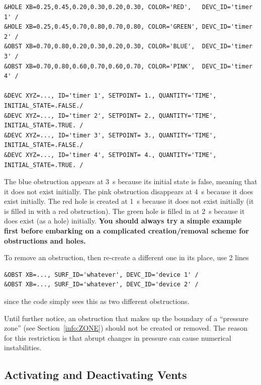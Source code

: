 \documentclass[11pt]{book}
\begin{document}
\footnotesize
\begin{verbatim}
&HOLE XB=0.25,0.45,0.20,0.30,0.20,0.30, COLOR='RED',   DEVC_ID='timer 1' /
&HOLE XB=0.25,0.45,0.70,0.80,0.70,0.80, COLOR='GREEN', DEVC_ID='timer 2' /
&OBST XB=0.70,0.80,0.20,0.30,0.20,0.30, COLOR='BLUE',  DEVC_ID='timer 3' /
&OBST XB=0.70,0.80,0.60,0.70,0.60,0.70, COLOR='PINK',  DEVC_ID='timer 4' /

&DEVC XYZ=..., ID='timer 1', SETPOINT= 1., QUANTITY='TIME', INITIAL_STATE=.FALSE./
&DEVC XYZ=..., ID='timer 2', SETPOINT= 2., QUANTITY='TIME', INITIAL_STATE=.TRUE. /
&DEVC XYZ=..., ID='timer 3', SETPOINT= 3., QUANTITY='TIME', INITIAL_STATE=.FALSE./
&DEVC XYZ=..., ID='timer 4', SETPOINT= 4., QUANTITY='TIME', INITIAL_STATE=.TRUE. /
\end{verbatim}
\normalsize

\noindent
The blue obstruction appears at 3~s because its initial state is false, meaning that it does not exist initially. The pink
obstruction disappears at 4~s because it does exist initially. The red hole is created at 1~s because it does not exist initially (it is filled in with a
red obstruction). The green hole is filled in at 2~s because it does exist (as a hole) initially. {\bf You should always try a simple example first before
embarking on a complicated creation/removal scheme for obstructions and holes.}


To remove an obstruction, then re-create a different one in its place, use 2 lines

\footnotesize
\begin{verbatim}
&OBST XB=..., SURF_ID='whatever', DEVC_ID='device 1' /
&OBST XB=..., SURF_ID='whatever', DEVC_ID='device 2' /
\end{verbatim}

\normalsize
\noindent
since the code simply sees this as two different obstructions.

\begin{warning}
Until further notice, an obstruction that makes up the boundary of a ``pressure zone'' (see Section~\ref{info:ZONE}) should not be created or
removed. The reason for this restriction is that abrupt changes in pressure can cause numerical instabilities.
\end{warning}


\subsection{Activating and Deactivating Vents}
\label{info:activate_deactivate}
\end{document}
